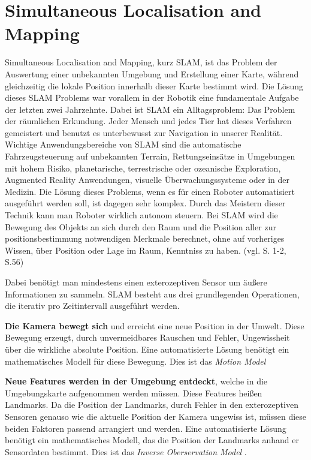 \chapter{Simultaneous Localisation and Mapping}

Simultaneous Localisation and Mapping, kurz SLAM, ist das Problem der Auswertung einer unbekannten Umgebung und Erstellung einer Karte, während gleichzeitig die lokale Position innerhalb dieser Karte bestimmt wird. Die Lösung dieses SLAM Problems war vorallem in der Robotik eine fundamentale Aufgabe der letzten zwei Jahrzehnte. Dabei ist SLAM ein Alltagsproblem: Das Problem der räumlichen Erkundung. Jeder Mensch und jedes Tier hat dieses Verfahren gemeistert und benutzt es unterbewusst zur Navigation in unserer Realität. Wichtige Anwendungsbereiche von SLAM sind die automatische Fahrzeugsteuerung auf unbekannten Terrain, Rettungseinsätze in Umgebungen mit hohem Risiko, planetarische, terrestrische oder ozeanische Exploration, Augmented Reality Anwendungen, visuelle Überwachungssysteme oder in der Medizin.
Die Lösung dieses Problems, wenn es für einen Roboter automatisiert ausgeführt werden soll, ist dagegen sehr komplex. Durch das Meistern dieser Technik kann man Roboter wirklich autonom steuern. Bei SLAM wird die Bewegung des Objekts an sich durch den Raum und die Position aller zur positionsbestimmung notwendigen Merkmale berechnet, ohne auf vorheriges Wissen, über Position oder Lage im Raum, Kenntniss zu haben. (vgl. \cite{slam} S. 1-2, \cite{survey} S.56) 

Dabei benötigt man mindestens einen exterozeptiven Sensor um äußere Informationen zu sammeln.
SLAM besteht aus drei grundlegenden Operationen, die iterativ pro Zeitintervall ausgeführt werden.

\textbf{Die Kamera bewegt sich} und erreicht eine neue Position in der Umwelt. Diese Bewegung erzeugt, durch unvermeidbares Rauschen und Fehler, Ungewissheit über die wirkliche absolute Position. Eine automatisierte Lösung benötigt ein mathematisches Modell für diese Bewegung. Dies ist das \glqq\textit{Motion Model}\grqq

\textbf{Neue Features werden in der Umgebung entdeckt}, welche in die Umgebungskarte aufgenommen werden müssen. Diese Features heißen \glqq Landmarks\grqq . Da die Position der Landmarks, durch Fehler in den exterozeptiven Sensoren genauso wie die aktuelle Position der Kamera ungewiss ist, müssen diese beiden Faktoren passend arrangiert und werden. Eine automatisierte Lösung benötigt ein mathematisches Modell, das die Position der Landmarks anhand er Sensordaten bestimmt. Dies ist das \glqq \textit{Inverse Oberservation Model} \grqq{}.

